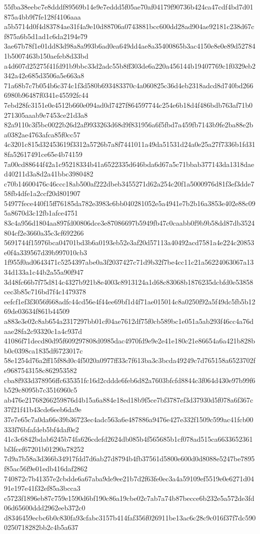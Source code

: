 {55fba38eebc7e8dddf89569b14e9e7eddd5f05ae70af04179f90736b424ca47cdf4bd7d01875a4bb9f7fe128f4106aaa
a5b5714d0f4d83784ae31f4a9e10d88706a0743881bcc600dd28ad904ae92181c238d67cf875a6b5d1ad1c6da2194e79
3ae67b78f1e01dd83d98a8a993b6ad0ea649dd4ae8a35400865b3ac4150e8e0e89d527841b5007463b150aefeb8d33bd
a4d607d25275f41fd91b9bbc33d2adc55b8ff303de6a220a456144b19407769c1f0329eb2342a42e685d3506a5e663a8
71a68b7c7b054b6c374c1f3d580b693483370c4a060825c36d4eb2318adcd8d740bd2666980b96487f0341e45592fc44
7ebd28fc3151e0e4512b660e094ad0d7427f864597744c254e6b18d4f486bdb763af71b0271305aaab9e7453ce21d3a8
82a9110c3f5bc0022b26d2af9933263d68d9f831956a6f5fbd7a459fb7143b9fe2ba88e2ba0382ae4763afca85f0cc57
4c3201c815d32453619f3312a5726b7a8f7441011a49da51531d24a0e25a27f7336b1fd318fa52617491ce65e4b74159
7a00cd88644f42a1c95218334b41a6522335d646bda6d67a5c71bbab377143da1318daed40211d3a8d2a41bbc3980482
c70b14600476c46ccc18ab500af222dbeb3455271d62a254c20f1a5000976d81f3ef3dde758fb4dfe1a2ccf20d801907
54977fece440f15ff76185da782e3983c6bb040281052e5a4941e7b2b16a3853e402e88c095a8670d3c12fb1afce4751
83c4a956d1804aa897fd00806dce3e87086697b5949fb47c0caabb0f9b9b58dd87db3524804cf2e3660a35c3cf692266
5691744f15976bca04701bd3b6a0193eb52e3af20d57113a40492acd7581a4e224c20853e0f4a339567d39b997010cb3
1f955f0ad0643471c5254397abe0a3f2037427c71d9b32f7be4cc11c21a56224063067a1334d133a1c44b2a55a90f947
3d48fc66b7f75d814c4327b921b8e4003c8913124a1d68c83068b1876235dcbfd0e53858cec3b85c716bd7f4c1479378
eefcf1ef3f3056f668adfc44cd56e4f44ee69bf1d4f71ae015014c8a0250f92a5f49dc5fb5b1269de03634f861b44509
a883e3e02c8ab654a2317297bb01cf04ae7612df75f0cb589bc1e051a5ab293f46cc4a76daae28fa2c93320c1a4c937d
41086f71decd80d95f609297808d0985dac4970fd9e9e2e41e180c21e86654a6a421b828bb0c0398ca1835df6723017c
58e1254d76a2ff15f88d0c4f5020a0977ff33c7f613ba3c3bcda49249c7d765158a6523702fe9687543158c862953582
cba8f933d378956ffc635351fc16d2cddde6feb6d82a7603bfcfd8844c3f064d430e97b99f6b529c8095b7c3516960c5
ab476e21768266259876d4b15a6a884e18ed18b9f5ce7bf3787ef3d37930d5f078a6f367c37f21f41b43cde6eeb6da9e
37e7e65c7a0da66e39b36723ec4adc563a6e487886a9476e427e332f1509c599ac41fcb00333f76bfafdeb5bf4daf0e2
41c3c6842bdab6245b74fa626cdefd2624db085b4f565685b1cf078ad515ca6633652361bf3fcef67201b01290a78252
7d9a7b58a3d366b34917fdd7d6ab27d8794b4fb37561d5800e600d0d8088e5247be7895f85ac56f9e01edb416daf2862
740872c7b41357e2cbdde6a67aba9de9ee21b7d2f63fe0ec3a4a59109ef5519e0e6271d0491e197e41f32ef85a3bcca3
c5723f1896eb87c759e1590d6bf190c86a19cbe02c7ab7a74b87becce6b232e5a572de3fd06d65600ddd2962eeb372c0
d8346459ecbc6b0c830fa93cfabc3157b414faf356f026911be13ac6c28c9c016f37f7dc5900250718282bb2c4b5a637
}
